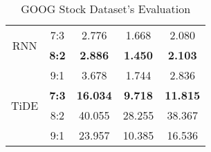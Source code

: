 \documentclass{ieeeojies}
\begin{document}
\begin{table}[H]
\begin{tabular}{|c|c|c|c|c|}
         \hline
         \multirow{2}{*}{RNN} & 7:3 & 2.776 & 1.668 & 2.080 
         \\ & \textbf{8:2} & \textbf{2.886} & \textbf{1.450} & \textbf{2.103} 
         \\ & 9:1 & 3.678 &	1.744 & 2.836 \\
         \hline
         \multirow{2}{*}{TiDE} & \textbf{7:3} & \textbf{16.034} &  \textbf{9.718} &  \textbf{11.815} 
         \\ & 8:2 & 40.055 & 28.255 & 38.367 
         \\ & 9:1 & 23.957 & 10.385 & 16.536\\
         \hline
    \end{tabular}
    \caption{GOOG Stock Dataset's Evaluation}
    \label{mbbresult}
\end{table}
\end{document}
